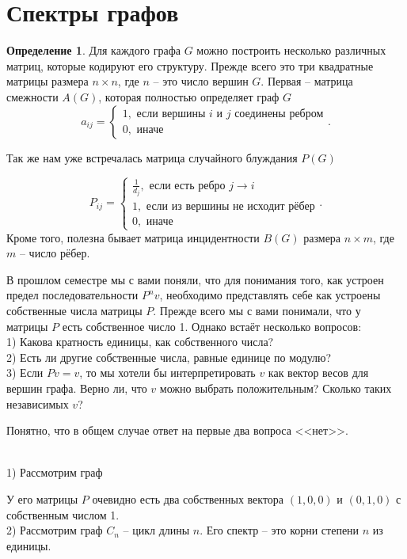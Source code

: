 \documentclass[10pt,a4paper,oneside]{book}
\theoremstyle{definition}
\newtheorem*{defn}{{\color{yellow!20!red} Определение}}
\def\exm{\noindent {\bf Примеры:}}
\def\dfn{\begin{defn}}
\def\edfn{\end{defn}}
\begin{document}
\section{Спектры графов}

\dfn
Для каждого графа $G$ можно построить  несколько  различных матриц, которые кодируют его структуру. Прежде всего это три квадратные матрицы  размера $n\times n$, где $n$ -- это число вершин $G$. 
Первая -- матрица смежности  $A(G)$, которая полностью определяет граф $G$
$$a_{ij}=\begin{cases} 1, \text{ если вершины $i$ и $j$ соединены ребром}\\
0, \text{ иначе }
\end{cases}.$$

Так же нам уже встречалась матрица случайного блуждания  $P(G)$

$$P_{ij}=\begin{cases}
\frac{1}{d_j}, \text{ если есть ребро $j\to i$}\\
1, \text{ если из вершины не исходит рёбер} \\
0, \text{ иначе }
\end{cases}.$$
Кроме того, полезна бывает матрица инцидентности $B(G)$ размера $n\times m$, где $m$ -- число рёбер.
\edfn

В прошлом семестре мы с вами поняли, что для понимания того, как устроен предел последовательности $P^nv$, необходимо представлять себе как устроены собственные числа матрицы $P$. Прежде всего мы с вами понимали, что у матрицы $P$ есть собственное число 1. Однако встаёт несколько вопросов:\\
1) Какова кратность единицы, как собственного числа?\\
2) Есть ли другие собственные числа, равные единице по модулю?\\
3) Если $Pv=v$, то мы хотели бы интерпретировать $v$ как вектор весов для вершин графа. Верно ли, что $v$ можно выбрать положительным? Сколько таких независимых $v$?

Понятно, что в общем случае ответ на первые два вопроса <<нет>>.

\exm \\
1) Рассмотрим граф 
\begin{center}
\end{center}
У его матрицы $P$ очевидно есть два собственных вектора $(1,0,0)$ и $(0,1,0)$ с собственным числом 1.\\
2) Рассмотрим граф $C_n$ -- цикл длины $n$. Его спектр -- это корни степени $n$ из единицы.\\
\end{document}
